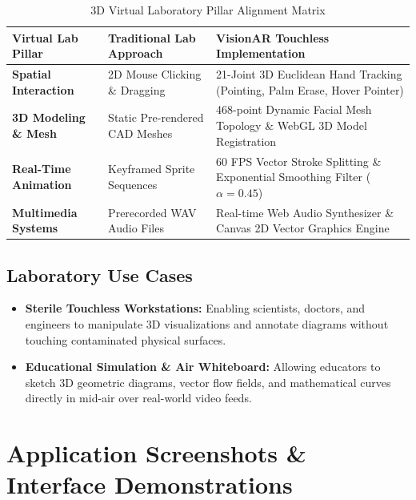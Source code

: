 \documentclass[11pt,a4paper]{article}
\begin{document}
\begin{table}[h!]
\centering
\caption{3D Virtual Laboratory Pillar Alignment Matrix}
\vspace{2mm}
\begin{tabular}{@{}p{3.8cm}p{5.2cm}p{6.0cm}@{}}
\toprule
\textbf{Virtual Lab Pillar} & \textbf{Traditional Lab Approach} & \textbf{VisionAR Touchless Implementation} \\ \midrule
\textbf{Spatial Interaction} & 2D Mouse Clicking \& Dragging & 21-Joint 3D Euclidean Hand Tracking (Pointing, Palm Erase, Hover Pointer) \\
\textbf{3D Modeling \& Mesh} & Static Pre-rendered CAD Meshes & 468-point Dynamic Facial Mesh Topology \& WebGL 3D Model Registration \\
\textbf{Real-Time Animation} & Keyframed Sprite Sequences & 60 FPS Vector Stroke Splitting \& Exponential Smoothing Filter ($\alpha=0.45$) \\
\textbf{Multimedia Systems} & Prerecorded WAV Audio Files & Real-time Web Audio Synthesizer \& Canvas 2D Vector Graphics Engine \\ \bottomrule
\end{tabular}
\end{table}

\subsection{Laboratory Use Cases}
\begin{itemize}
    \item \textbf{Sterile Touchless Workstations:} Enabling scientists, doctors, and engineers to manipulate 3D visualizations and annotate diagrams without touching contaminated physical surfaces.
    \item \textbf{Educational Simulation \& Air Whiteboard:} Allowing educators to sketch 3D geometric diagrams, vector flow fields, and mathematical curves directly in mid-air over real-world video feeds.
\end{itemize}

\newpage

\section{Application Screenshots \& Interface Demonstrations}
\end{document}
